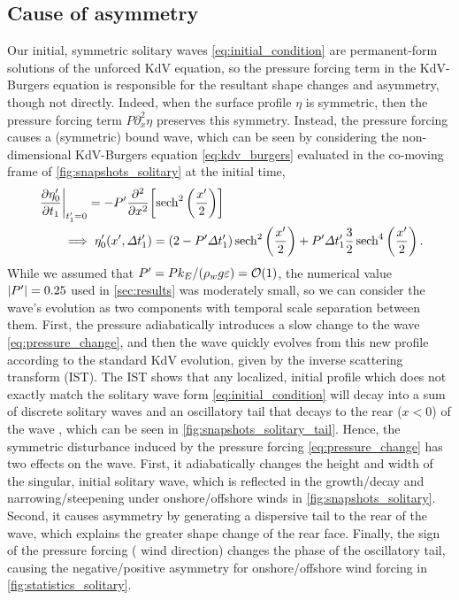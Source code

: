 \documentclass{jfm}
\renewcommand*{\epsilon}{\varepsilon}
\begin{document}
\subsection{\label{sec:physical_reason} Cause of asymmetry}
Our initial, symmetric solitary waves \cref{eq:initial_condition} are
permanent-form solutions of the unforced KdV equation, so the pressure
forcing term in the KdV-Burgers equation is responsible for the
resultant shape changes and asymmetry, though not directly.
Indeed, when the surface profile $\eta$ is symmetric, then the pressure
forcing term $P \partial_x^2 \eta$ preserves this symmetry.
Instead, the pressure forcing causes a (symmetric) bound wave, which can
be seen by considering the non-dimensional KdV-Burgers equation
\cref{eq:kdv_burgers} evaluated in the co-moving frame of
\cref{fig:snapshots_solitary} at the initial time,
\begin{equation}
  \begin{split}
  &\eval{\pdv{\eta'_0}{t_1}}_{t'_1=0} = -P' \pdv[2]{x} \bqty{
  \sech^2\pqty{\frac{x'}{2}}}
  \\
  &\qquad \implies \eta'_0(x', \Delta t'_1) =
  (2-P'\Delta t'_1) \sech^2\pqty{\frac{x'}{2}}
  +
  P' \Delta t'_1 \frac{3}{2}\sech^4\pqty{\frac{x'}{2}}
  \,.
  \end{split}
  \label{eq:pressure_change}
\end{equation}
While we assumed that $P' = Pk_E/(\rho_w g \epsilon) = \order{1}$, the
numerical value $\abs{P'} = 0.25$ used in \cref{sec:results} was
moderately small, so we can consider the wave's evolution as two
components with temporal scale separation between them.
First, the pressure adiabatically introduces a slow change to the wave
\cref{eq:pressure_change}, and then the wave quickly evolves from this
new profile according to the standard KdV evolution, given by the
inverse scattering transform (IST).
The IST shows that any localized, initial profile which does not exactly
match the solitary wave form \cref{eq:initial_condition} will decay into
a sum of discrete solitary waves and an oscillatory tail that decays to
the rear ($x<0$) of the wave \citep[\eg][]{mei2005nonlinear}, which can
be seen in \cref{fig:snapshots_solitary_tail}.
Hence, the symmetric disturbance induced by the pressure forcing
\cref{eq:pressure_change} has two effects on the wave.
First, it adiabatically changes the height and width of the singular,
initial solitary wave, which is reflected in the growth/decay and
narrowing/steepening under onshore/offshore winds in
\cref{fig:snapshots_solitary}.
Second, it causes asymmetry by generating a dispersive tail to the rear
of the wave, which explains the greater shape change of the rear face.
Finally, the sign of the pressure forcing (\ie{} wind direction) changes
the phase of the oscillatory tail, causing the negative/positive
asymmetry for onshore/offshore wind forcing in
\cref{fig:statistics_solitary}.
\end{document}
